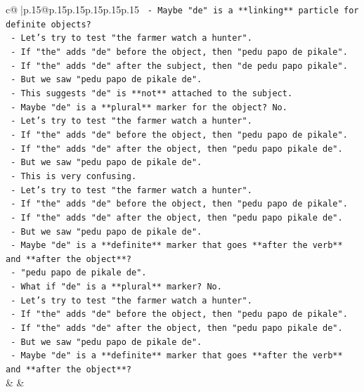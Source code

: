 \documentclass{article}
\begin{document}
{\begin{supertabular}{c@{$\;$}|p{.15\linewidth}@{}p{.15\linewidth}p{.15\linewidth}p{.15\linewidth}p{.15\linewidth}p{.15\linewidth}}
{{{\texttt{             {-} Maybe "de" is a **linking** particle for definite objects?} \\
\texttt{             {-} Let's try to test "the farmer watch a hunter".} \\
\texttt{             {-} If "the" adds "de" before the object, then "pedu papo de pikale".} \\
\texttt{             {-} If "the" adds "de" after the subject, then "de pedu papo pikale".} \\
\texttt{             {-} But we saw "pedu papo de pikale de".} \\
\texttt{             {-} This suggests "de" is **not** attached to the subject.} \\
\texttt{             {-} Maybe "de" is a **plural** marker for the object? No.} \\
\texttt{             {-} Let's try to test "the farmer watch a hunter".} \\
\texttt{             {-} If "the" adds "de" before the object, then "pedu papo de pikale".} \\
\texttt{             {-} If "the" adds "de" after the object, then "pedu papo pikale de".} \\
\texttt{             {-} But we saw "pedu papo de pikale de".} \\
\texttt{             {-} This is very confusing.} \\
\texttt{             {-} Let's try to test "the farmer watch a hunter".} \\
\texttt{             {-} If "the" adds "de" before the object, then "pedu papo de pikale".} \\
\texttt{             {-} If "the" adds "de" after the object, then "pedu papo pikale de".} \\
\texttt{             {-} But we saw "pedu papo de pikale de".} \\
\texttt{             {-} Maybe "de" is a **definite** marker that goes **after the verb** and **after the object**?} \\
\texttt{             {-} "pedu papo de pikale de".} \\
\texttt{             {-} What if "de" is a **plural** marker? No.} \\
\texttt{             {-} Let's try to test "the farmer watch a hunter".} \\
\texttt{             {-} If "the" adds "de" before the object, then "pedu papo de pikale".} \\
\texttt{             {-} If "the" adds "de" after the object, then "pedu papo pikale de".} \\
\texttt{             {-} But we saw "pedu papo de pikale de".} \\
\texttt{             {-} Maybe "de" is a **definite** marker that goes **after the verb** and **after the object**?} \\
            }
        }
    }
    & & \\ \\


\end{supertabular}}
\end{document}
